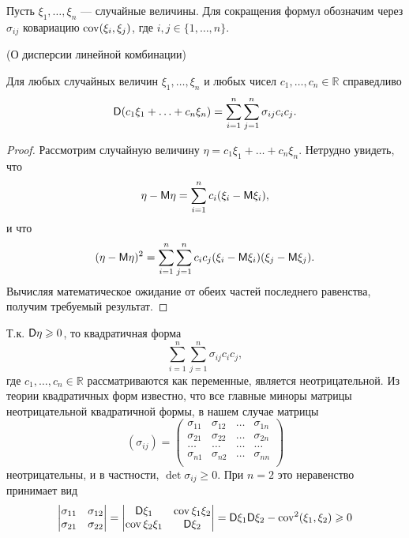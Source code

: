 Пусть $\xi_1,\dots, \xi_n$ — случайные величины. Для сокращения формул обозначим через $\sigma_{ij}$ ковариацию $\operatorname{cov}(\xi_i, \xi_j)$, где $i, j \in \{1, \ldots, n\}.$

\begin{lemma}
	(О дисперсии линейной комбинации)

	Для любых случайных величин $\xi_1,\dots , \xi_n$ и любых чисел $c_1,\dots, c_n \in \mathbb{R}$ справедливо
	\begin{equation*}
		\mathsf{D}(c_1 \xi_1+\ldots+c_n \xi_n)=\sum_{i=1}^n\sum_{j=1}^n\sigma_{ij}c_ic_j.
	\end{equation*}
\end{lemma}

\begin{proof}
	Рассмотрим случайную величину $\eta = c_1 \xi_1 +\dots+ c_n \xi_n$.
	Нетрудно увидеть, что
	\begin{equation*}
		\eta-\mathsf{M}\eta=\sum_{i=1}^nc_i(\xi_i-\mathsf{M} \xi_i),
	\end{equation*}
	и что
	\begin{equation*}
		(\eta-\mathsf{M}\eta)^2=\sum_{i=1}^n\sum_{j=1}^nc_ic_j(\xi_i-\mathsf{M} \xi_i)(\xi_j-\mathsf{M} \xi_j).
	\end{equation*}
	Вычисляя математическое ожидание от обеих частей последнего равенства,
	получим требуемый результат.
\end{proof}

\begin{zam}\label{zam:19.5}
	Т.к. $\mathsf{D}\eta \geqslant 0$, то квадратичная форма $$\sum_{i=1}^n\sum_{j=1}^n\sigma_{ij}c_ic_j,$$ где $c_1,\dots, c_n \in \mathbb{R}$ рассматриваются как переменные, является неотрицательной. Из теории квадратичных форм известно, что все главные миноры матрицы неотрицательной квадратичной формы, в нашем случае матрицы
	\begin{equation*}
		(\sigma_{ij})=	
		\begin{pmatrix}
	  		\sigma_{11}& \sigma_{12}& \ldots & \sigma_{1n}\\
	  		\sigma_{21}& \sigma_{22}& \ldots & \sigma_{2n} \\
	  		\ldots & \ldots& \ldots & \ldots \\
	  		\sigma_{n1}& \sigma_{n2}& \ldots & \sigma_{nn}\\
		\end{pmatrix}
	\end{equation*}
	неотрицательны, и в частности, $\det\sigma_{ij} \geqslant 0$. При $n = 2$ это неравенство принимает вид
	\begin{equation*}
		\begin{vmatrix}
			\sigma_{11}& \sigma_{12}\\
		 	\sigma_{21}& \sigma_{22}\\
		\end{vmatrix}
		=
		\begin{vmatrix}
			\mathsf{D} \xi_1 & \operatorname{cov}{\xi_1 \xi_2}\\
			\operatorname{cov}{\xi_2 \xi_1} & \mathsf{D} \xi_2\\
		\end{vmatrix}
		=\mathsf{D} \xi_1 \mathsf{D} \xi_2-\operatorname{cov}^2(\xi_1, \xi_2)\geqslant 0		
	\end{equation*}
\end{zam}

